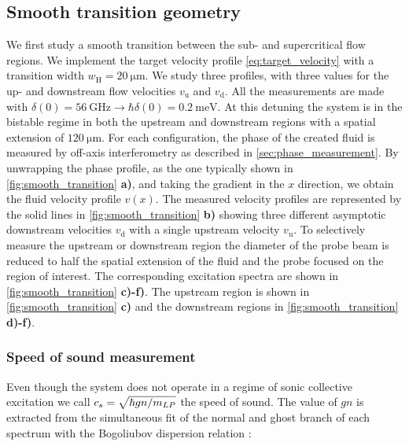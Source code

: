 \subsection{Smooth transition geometry}

We first study a smooth transition between the sub- and supercritical flow regions.
We implement the target velocity profile \autoref{eq:target_velocity} with a transition width $w_\mathrm{H}=\SI{20}{\micro\meter}$. 
We study three profiles, with three values for the up- and downstream flow velocities $v_\mathrm{u}$ and $v_\mathrm{d}$.
All the measurements are made with $\delta(0)=\SI{56}{\giga\hertz}\rightarrow \hbar\delta(0)= \SI{0.2}{\milli \electronvolt}$.
At this detuning the system is in the bistable regime in both the upstream and downstream regions with a spatial extension of $\SI{120}{\micro \meter}$.
For each configuration, the phase of the created fluid is measured by off-axis interferometry as described in \autoref{sec:phase_measurement}. By unwrapping the phase profile, as the one typically shown in \autoref{fig:smooth_transition} \textbf{a)}, and taking the gradient in the $x$ direction, we obtain the fluid velocity profile $v(x)$.
The measured velocity profiles are represented by the solid lines in \autoref{fig:smooth_transition} \textbf{b)} showing three different asymptotic downstream velocities $v_\mathrm{d}$ with a single upstream velocity $v_\mathrm{u}$. 
To selectively measure the upstream or downstream region the diameter of the probe beam is reduced to half the spatial extension of the fluid and the probe focused on the region of interest. The corresponding excitation spectra are shown in \autoref{fig:smooth_transition} \textbf{c)-f)}. 
The upstream region is shown in \autoref{fig:smooth_transition} \textbf{c)} and the downstream regions in \autoref{fig:smooth_transition} \textbf{d)-f)}.

\bigskip

\subsubsection{Speed of sound measurement} Even though the system does not operate in a regime of sonic collective excitation we call $c_s=\sqrt{\hbar g n/m_{LP}}$ the speed of sound. The value of $gn$ is extracted 
from the simultaneous fit of the normal and ghost branch of each spectrum with the Bogoliubov dispersion relation :

